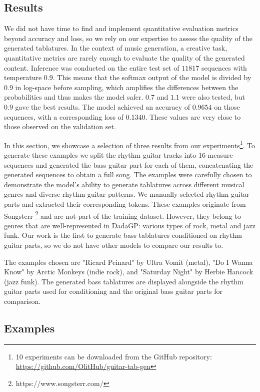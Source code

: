 \subsection{Results}


We did not have time to find and implement quantitative evaluation metrics beyond accuracy and loss, 
so we rely on our expertise to assess the quality of the generated tablatures.
In the context of music generation, a creative task, quantitative metrics are rarely enough to evaluate the quality of the generated content.
Inference was conducted on the entire test set of $11 817$ sequences with temperature $0.9$.
This means that the softmax output of the model is divided by $0.9$ in log-space before sampling, which amplifies the differences between the probabilities and thus makes the model safer.
$0.7$ and $1.1$ were also tested, but $0.9$ gave the best results.
The model achieved an accuracy of $0.9654$ on those sequences, with a corresponding loss of $0.1340$.
These values are very close to those observed on the validation set.

In this section, we showcase a selection of three results from our experiments\footnote{10 experiments can be downloaded from the GitHub repository: \url{https://github.com/OlitHub/guitar-tab-gen}}.
To generate these examples we split the rhythm guitar tracks into 16-measure sequences and generated the bass guitar part for each of them, concatenating the generated sequences to obtain a full song.
The examples were carefully chosen to demonstrate the model's ability to generate tablatures across different musical genres and diverse rhythm guitar patterns.
We manually selected rhythm guitar parts and extracted their corresponding tokens.
These examples originate from Songsterr \footnote{https://www.songsterr.com/} and are not part of the training dataset.
However, they belong to genres that are well-represented in DadaGP: various types of rock, metal and jazz funk.
Our work is the first to generate bass tablatures conditioned on rhythm guitar parts, so we do not have other models to compare our results to.

The examples chosen are "Ricard Peinard" by Ultra Vomit (metal), "Do I Wanna Know" by Arctic Monkeys (indie rock), and "Saturday Night" by Herbie Hancock (jazz funk).
The generated bass tablatures are displayed alongside the rhythm guitar parts used for conditioning and the original bass guitar parts for comparison.

\subsection{Examples}

